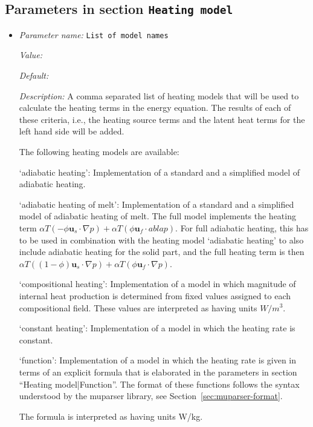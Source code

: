 \subsection{Parameters in section \tt Heating model}
\label{parameters:Heating_20model}

\begin{itemize}
\item {\it Parameter name:} {\tt List of model names}
\label{parameters:Heating model/List of model names}


{\it Value:} 


{\it Default:} 


{\it Description:} A comma separated list of heating models that will be used to calculate the heating terms in the energy equation. The results of each of these criteria, i.e., the heating source terms and the latent heat terms for the left hand side will be added.

The following heating models are available:

`adiabatic heating': Implementation of a standard and a simplified model of adiabatic heating.

`adiabatic heating of melt': Implementation of a standard and a simplified model of adiabatic heating of melt. The full model implements the heating term 
$\alpha T (-\phi \mathbf u_s \cdot \nabla p) + \alpha T (\phi \mathbf u_f \cdot 
abla p)$.
For full adiabatic heating, this has to be used in combination with the heating model `adiabatic heating' to also include adiabatic heating for the solid part, and the full heating term is then $\alpha T ((1-\phi) \mathbf u_s \cdot \nabla p) + \alpha T (\phi \mathbf u_f \cdot \nabla p)$.

`compositional heating': Implementation of a model in which magnitude of internal heat production is determined from fixed values assigned to each compositional field. These values are interpreted as having units $W/m^3$.

`constant heating': Implementation of a model in which the heating rate is constant.

`function': Implementation of a model in which the heating rate is given in terms of an explicit formula that is elaborated in the parameters in section ``Heating model|Function''. The format of these functions follows the syntax understood by the muparser library, see Section~\ref{sec:muparser-format}.

The formula is interpreted as having units W/kg.


\end{itemize}
